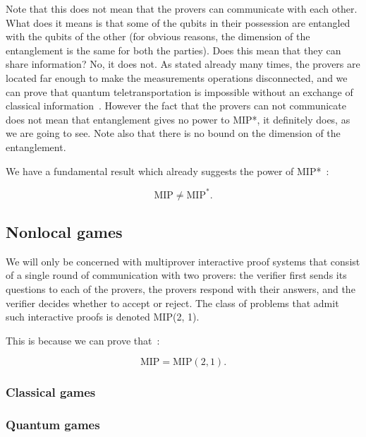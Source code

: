 Note that this does not mean that the provers can communicate with each other. What does it means is that some of the qubits in their possession are entangled with the qubits of the other (for obvious reasons, the dimension of the entanglement is the same for both the parties). Does this mean that they can share information? No, it does not. As stated already many times, the provers are located far enough to make the measurements operations disconnected, and we can prove that quantum teletransportation is impossible without an exchange of classical information~\cite{NielsenChuang}. However the fact that the provers can not communicate does not mean that entanglement gives no power to MIP*, it definitely does, as we are going to see.
Note also that there is no bound on the dimension of the entanglement.

We have a fundamental result which already suggests the power of MIP*~\cite{mipre}:

\begin{theorem}
    \begin{equation}
\text{MIP} \neq \text{MIP}^{*}.
    \end{equation}
\end{theorem}

\subsection{Nonlocal games}

We will only be concerned with multiprover interactive proof systems
that consist of a single round of communication with two provers: the verifier first sends its questions to
each of the provers, the provers respond with their answers, and the verifier decides whether to accept or
reject. The class of problems that admit such interactive proofs is denoted MIP(2, 1).

This is because we can prove that~\cite{mipre}:
\begin{theorem}
    \begin{equation}
    \text{MIP}=\text{MIP}(2,1).
    \end{equation}
\end{theorem}

\subsubsection{Classical games}

\subsubsection{Quantum games}\label{subsection:quantum-games}

